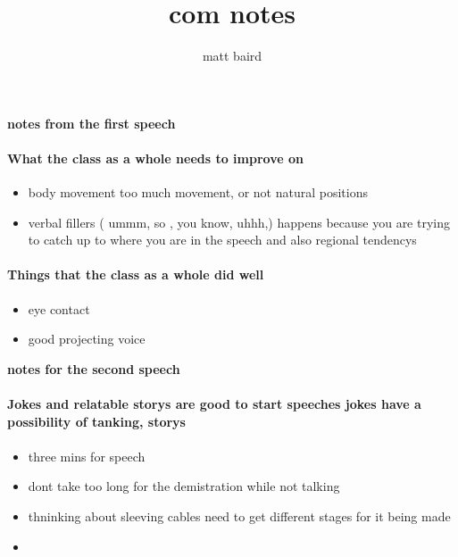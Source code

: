 \documentclass[10pt,a4paper]{report}
\author{matt baird}
\title{com notes}
\begin{document}
\maketitle

\begin{center}
\textbf{notes from the first speech}
\end{center}
\paragraph{What the class as a whole needs to improve on}
\begin{itemize}
\item body movement too much movement, or not natural positions
\item verbal fillers ( ummm, so , you know, uhhh,) happens because you are trying to catch up to where you are in the speech and also regional tendencys 
\end{itemize}
\paragraph{Things that the class as a whole did well }
\begin{itemize}
\item eye contact
\item good projecting voice 
\end{itemize}
\pagebreak
\begin{center}
\textbf{notes for the second speech}
\end{center}
\paragraph{Jokes and  relatable storys are good to start speeches jokes have a  possibility of tanking, storys }
\paragraph{}
\begin{itemize}
\item three mins for speech 
\item dont take too long for the demistration while not talking
\item thninking about sleeving cables need to get different stages for it being made 
\item 

\end{itemize}
\end{document}
